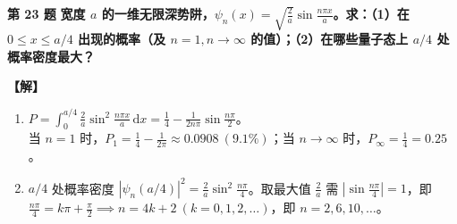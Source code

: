 \documentclass[zihao=5,a4paper,UTF8]{ctexart}
\newenvironment{prob}[2]{%
    \par\vspace{5pt}\noindent\textbf{\color{navy}#1} \textbf{#2}\par\nopagebreak\vspace{2pt}%
}{%
    \par\vspace{3pt}%
}
\newcommand{\sol}{\noindent\textbf{\color{tealaccent}【解】}\ }
\newcommand{\dd}{\mathrm{d}}
\begin{document}
\begin{prob}{第 23 题}{宽度 $a$ 的一维无限深势阱，$\psi_n(x) = \sqrt{\frac{2}{a}}\sin\frac{n\pi x}{a}$。求：（1）在 $0\le x\le a/4$ 出现的概率（及 $n=1, n\to\infty$ 的值）；（2）在哪些量子态上 $a/4$ 处概率密度最大？}
\sol
\begin{enumerate}[leftmargin=2em, itemsep=2pt]
    \item $P = \int_0^{a/4} \frac{2}{a}\sin^2\frac{n\pi x}{a}\,\dd x = \frac{1}{4} - \frac{1}{2n\pi}\sin\frac{n\pi}{2}$。\\
    当 $n=1$ 时，$P_1 = \frac{1}{4} - \frac{1}{2\pi} \approx 0.0908\ (9.1\%)$；当 $n\to\infty$ 时，$P_\infty = \frac{1}{4} = 0.25$。
    \item $a/4$ 处概率密度 $|\psi_n(a/4)|^2 = \frac{2}{a}\sin^2\frac{n\pi}{4}$。取最大值 $\frac{2}{a}$ 需 $\left|\sin\frac{n\pi}{4}\right| = 1$，即 $\frac{n\pi}{4} = k\pi + \frac{\pi}{2} \implies n = 4k + 2\ (k=0,1,2,\dots)$，即 $n = 2, 6, 10, \dots$。
\end{enumerate}
\end{prob}

\end{document}
